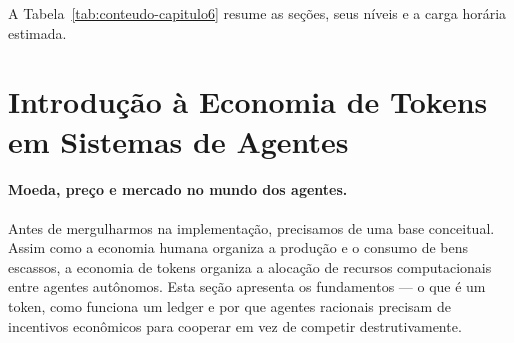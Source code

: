 A Tabela~\ref{tab:conteudo-capitulo6} resume as seções, seus níveis
e a carga horária estimada.

\begin{table}[htb]
\centering
    \small
\caption{Conteúdo do Capítulo 6}
\label{tab:conteudo-capitulo6}
\end{table}

\section{Introdução à Economia de Tokens em Sistemas de Agentes}
\label{sec:introducao-token-economy}
\nivelzero

\paragraph{Moeda, preço e mercado no mundo dos agentes.} Antes de mergulharmos na implementação, precisamos de uma base conceitual. Assim como a economia humana organiza a produção e o consumo de bens escassos, a economia de tokens organiza a alocação de recursos computacionais entre agentes autônomos. Esta seção apresenta os fundamentos --- o que é um token, como funciona um ledger e por que agentes racionais precisam de incentivos econômicos para cooperar em vez de competir destrutivamente.

